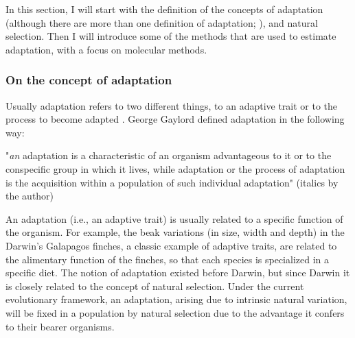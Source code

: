 
In this section, I will start with the definition of the concepts of adaptation (although there are more than one definition of adaptation; \citealp{endler1986natural}), and natural selection. Then I will introduce some of the methods that are used to estimate adaptation, with a focus on molecular methods.

\subsubsection{On the concept of adaptation}
Usually adaptation refers to two different things, to an adaptive trait or to the process to become adapted \citep{endler1986natural}.
George Gaylord \citet{Simpson1953} defined adaptation in the following way: 

"\textit{an} adaptation is a characteristic of an organism advantageous to it or to the conspecific group in which it lives, while adaptation or the process of adaptation is the acquisition within a population of such individual adaptation" (italics by the author)

An adaptation (i.e., an adaptive trait) is usually related to a specific function of the organism. For example, the beak variations (in size, width and depth) in the Darwin's Galapagos finches, a classic example of adaptive traits, are related to the alimentary function of the finches, so that each species is specialized in a specific diet.
The notion of adaptation existed before Darwin, but since Darwin it is closely related to the concept of natural selection. Under the current evolutionary framework, an adaptation, arising due to intrinsic natural variation, will be fixed in a population by natural selection due to the advantage it confers to their bearer organisms.

%
%


